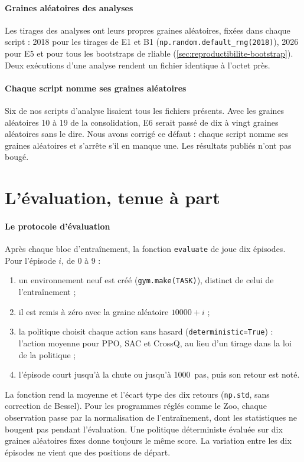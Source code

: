 \paragraph{Graines aléatoires des analyses}
Les tirages des analyses ont leurs propres graines aléatoires, fixées dans chaque script : 2018 pour les tirages de E1 et
B1 (\texttt{np.random.default\_rng(2018)}), 2026 pour E5 et pour tous les bootstraps de rliable
(\cref{sec:reproductibilite-bootstrap}). Deux exécutions d'une analyse rendent un fichier identique à l'octet
près.

\paragraph{Chaque script nomme ses graines aléatoires}
Six de nos scripts d'analyse lisaient tous les fichiers présents. Avec les graines aléatoires 10 à 19 de la
consolidation, E6 serait passé de dix à vingt graines aléatoires sans le dire. Nous avons corrigé ce défaut :
chaque script nomme ses graines aléatoires et s'arrête s'il en manque une. Les résultats publiés n'ont pas
bougé.

\section{L'évaluation, tenue à part}\label{sec:evaluation}

\paragraph{Le protocole d'évaluation}
Après chaque bloc d'entraînement, la fonction \texttt{evaluate} de  joue dix épisodes. Pour
l'épisode $i$, de 0 à 9 :
\begin{enumerate}
  \item un environnement neuf est créé (\texttt{gym.make(TASK)}), distinct de celui de l'entraînement ;
  \item il est remis à zéro avec la graine aléatoire $\num{10000}+i$ ;
  \item la politique choisit chaque action sans hasard (\texttt{deterministic=True}) : l'action moyenne pour
    PPO, SAC et CrossQ, au lieu d'un tirage dans la loi de la politique ;
  \item l'épisode court jusqu'à la chute ou jusqu'à \num{1000}~pas, puis son retour est noté.
\end{enumerate}
La fonction rend la moyenne et l'écart type des dix retours (\texttt{np.std}, sans correction de Bessel). Pour
les programmes réglés comme le Zoo, chaque observation passe par la normalisation de l'entraînement, dont les
statistiques ne bougent pas pendant l'évaluation. Une politique déterministe évaluée sur dix graines aléatoires fixes
donne toujours le même score. La variation entre les dix épisodes ne vient que des positions de départ.

